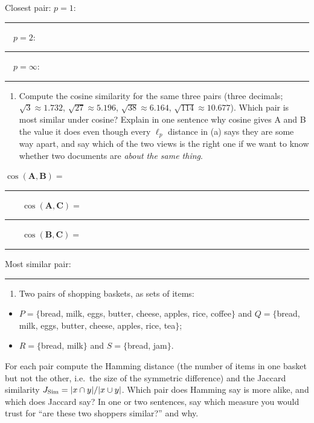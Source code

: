 \documentclass[
  11pt,
]{article}
\providecommand{\tightlist}{%
  \setlength{\itemsep}{0pt}\setlength{\parskip}{0pt}}
\newcommand{\answerspace}[1]{\par\vspace*{#1}}  %
\newcommand{\blank}[1][1.2in]{\rule{#1}{0.4pt}}
\begin{document}
Closest pair: \(p=1\): \blank[0.7in] \(\quad p=2\):
\blank[0.7in] \(\quad p=\infty\): \blank[0.7in]

\answerspace{2.2in}

\begin{enumerate}
\def\labelenumi{(\alph{enumi})}
\setcounter{enumi}{1}
\tightlist
\item
  Compute the cosine similarity for the same three pairs (three
  decimals; \(\sqrt{3}\approx1.732\), \(\sqrt{27}\approx5.196\),
  \(\sqrt{38}\approx6.164\), \(\sqrt{114}\approx10.677\)). Which pair is
  most similar under cosine? Explain in one sentence why cosine gives A
  and B the value it does even though every \(\ell_p\) distance in (a)
  says they are some way apart, and say which of the two views is the
  right one if we want to know whether two documents are \emph{about the
  same thing}.
\end{enumerate}

\(\cos(\mathbf{A},\mathbf{B}) =\)
\blank[0.8in] \(\qquad \cos(\mathbf{A},\mathbf{C}) =\)
\blank[0.8in] \(\qquad \cos(\mathbf{B},\mathbf{C}) =\) \blank[0.8in]

Most similar pair: \blank[0.8in]

\answerspace{2.4in}

\newpage %

\begin{enumerate}
\def\labelenumi{(\alph{enumi})}
\setcounter{enumi}{2}
\tightlist
\item
  Two pairs of shopping baskets, as sets of items:
\end{enumerate}

\begin{itemize}
\tightlist
\item
  \(P = \{\)bread, milk, eggs, butter, cheese, apples, rice,
  coffee\(\}\) and \(Q = \{\)bread, milk, eggs, butter, cheese, apples,
  rice, tea\(\}\);
\item
  \(R = \{\)bread, milk\(\}\) and \(S = \{\)bread, jam\(\}\).
\end{itemize}

For each pair compute the Hamming distance (the number of items in one
basket but not the other, i.e.~the size of the symmetric difference) and
the Jaccard similarity \(J_{\rm Sim} = |x\cap y|/|x\cup y|\). Which pair
does Hamming say is more alike, and which does Jaccard say? In one or
two sentences, say which measure you would trust for ``are these two
shoppers similar?'' and why.
\end{document}
